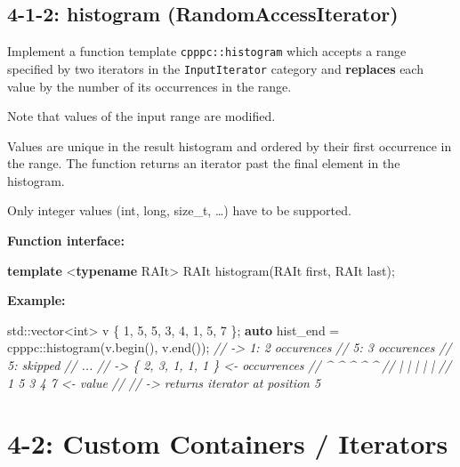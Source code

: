\documentclass[]{article}
\newenvironment{Shaded}{}{}
\newcommand{\KeywordTok}[1]{\textcolor[rgb]{0.00,0.44,0.13}{\textbf{{#1}}}}
\newcommand{\DataTypeTok}[1]{\textcolor[rgb]{0.56,0.13,0.00}{{#1}}}
\newcommand{\DecValTok}[1]{\textcolor[rgb]{0.25,0.63,0.44}{{#1}}}
\newcommand{\CommentTok}[1]{\textcolor[rgb]{0.38,0.63,0.69}{\textit{{#1}}}}
\newcommand{\NormalTok}[1]{{#1}}
\begin{document}
\subsection{4-1-2: histogram
(RandomAccessIterator)}\label{histogram-randomaccessiterator}

Implement a function template \texttt{cpppc::histogram} which accepts a
range specified by two iterators in the \texttt{InputIterator} category
and \textbf{replaces} each value by the number of its occurrences in the
range.

Note that values of the input range are modified.

Values are unique in the result histogram and ordered by their first
occurrence in the range. The function returns an iterator past the final
element in the histogram.

Only integer values (int, long, size\_t, \ldots{}) have to be supported.

\textbf{Function interface:}

\begin{Shaded}
\begin{Highlighting}[]
\KeywordTok{template} \NormalTok{<}\KeywordTok{typename} \NormalTok{RAIt>}
\NormalTok{RAIt histogram(RAIt first, RAIt last);}
\end{Highlighting}
\end{Shaded}

\textbf{Example:}

\begin{Shaded}
\begin{Highlighting}[]
\NormalTok{std::vector<}\DataTypeTok{int}\NormalTok{> v \{ }\DecValTok{1}\NormalTok{, }\DecValTok{5}\NormalTok{, }\DecValTok{5}\NormalTok{, }\DecValTok{3}\NormalTok{, }\DecValTok{4}\NormalTok{, }\DecValTok{1}\NormalTok{, }\DecValTok{5}\NormalTok{, }\DecValTok{7} \NormalTok{\};}
\KeywordTok{auto} \NormalTok{hist_end = cpppc::histogram(v.begin(), v.end());}
\CommentTok{// -> 1: 2 occurences}
\CommentTok{//    5: 3 occurences}
\CommentTok{//    5: skipped}
\CommentTok{//    ...}
\CommentTok{// -> \{ 2, 3, 1, 1, 1 \}  <- occurrences}
\CommentTok{//      ^  ^  ^  ^  ^}
\CommentTok{//      |  |  |  |  |}
\CommentTok{//      1  5  3  4  7    <- value}
\CommentTok{//}
\CommentTok{// -> returns iterator at position 5}
\end{Highlighting}
\end{Shaded}

\section{4-2: Custom Containers /
Iterators}\label{custom-containers-iterators}
\end{document}
